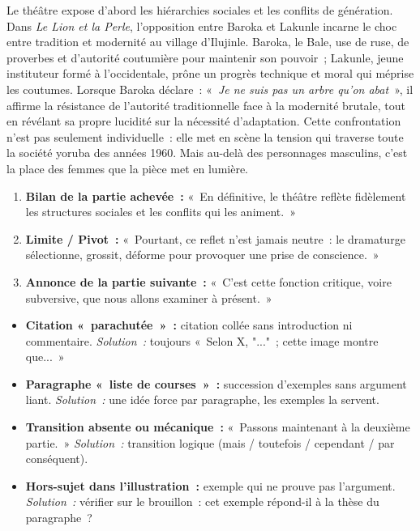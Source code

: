 \documentclass[11pt]{article}
\begin{document}
\begin{exemplebox}
Le théâtre expose d'abord les hiérarchies sociales et les conflits de génération. Dans \emph{Le Lion et la Perle}, l'opposition entre Baroka et Lakunle incarne le choc entre tradition et modernité au village d'Ilujinle. Baroka, le Bale, use de ruse, de proverbes et d'autorité coutumière pour maintenir son pouvoir~; Lakunle, jeune instituteur formé à l'occidentale, prône un progrès technique et moral qui méprise les coutumes. Lorsque Baroka déclare~: «~\emph{Je ne suis pas un arbre qu'on abat}~», il affirme la résistance de l'autorité traditionnelle face à la modernité brutale, tout en révélant sa propre lucidité sur la nécessité d'adaptation. Cette confrontation n'est pas seulement individuelle~: elle met en scène la tension qui traverse toute la société yoruba des années 1960. Mais au-delà des personnages masculins, c'est la place des femmes que la pièce met en lumière.
\end{exemplebox}

\begin{methode}
\begin{enumerate}
    \item \textbf{Bilan de la partie achevée~:} «~En définitive, le théâtre reflète fidèlement les structures sociales et les conflits qui les animent.~»
    \item \textbf{Limite / Pivot~:} «~Pourtant, ce reflet n'est jamais neutre~: le dramaturge sélectionne, grossit, déforme pour provoquer une prise de conscience.~»
    \item \textbf{Annonce de la partie suivante~:} «~C'est cette fonction critique, voire subversive, que nous allons examiner à présent.~»
\end{enumerate}
\end{methode}

\begin{attention}
\begin{itemize}
    \item \textbf{Citation «~parachutée~»~:} citation collée sans introduction ni commentaire. \emph{Solution~:} toujours «~Selon X, "..."~; cette image montre que...~»
    \item \textbf{Paragraphe «~liste de courses~»~:} succession d'exemples sans argument liant. \emph{Solution~:} une idée force par paragraphe, les exemples la servent.
    \item \textbf{Transition absente ou mécanique~:} «~Passons maintenant à la deuxième partie.~» \emph{Solution~:} transition logique (mais / toutefois / cependant / par conséquent).
    \item \textbf{Hors-sujet dans l'illustration~:} exemple qui ne prouve pas l'argument. \emph{Solution~:} vérifier sur le brouillon~: cet exemple répond-il à la thèse du paragraphe~?
\end{itemize}
\end{attention}
\end{document}
